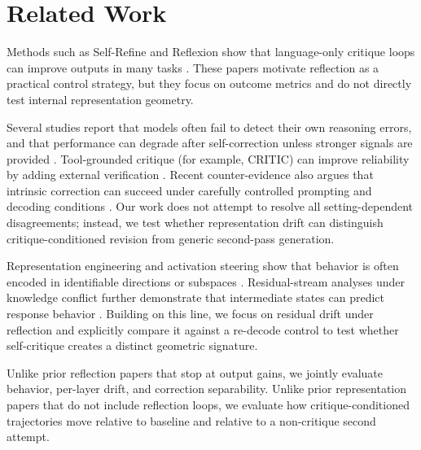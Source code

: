 \section{Related Work}
\label{sec:related}
 Methods such as Self-Refine and Reflexion show that language-only critique loops can improve outputs in many tasks \citep{madaan2023selfrefine,shinn2023reflexion}. These papers motivate reflection as a practical control strategy, but they focus on outcome metrics and do not directly test internal representation geometry.

 Several studies report that models often fail to detect their own reasoning errors, and that performance can degrade after self-correction unless stronger signals are provided \citep{huang2023llmscannot,chen2024errorlocation}. Tool-grounded critique (for example, CRITIC) can improve reliability by adding external verification \citep{gou2024critic}. Recent counter-evidence also argues that intrinsic correction can succeed under carefully controlled prompting and decoding conditions \citep{liu2024intrinsic}. Our work does not attempt to resolve all setting-dependent disagreements; instead, we test whether representation drift can distinguish critique-conditioned revision from generic second-pass generation.

 Representation engineering and activation steering show that behavior is often encoded in identifiable directions or subspaces \citep{zou2023representation,turner2023steering,arditi2024refusal}. Residual-stream analyses under knowledge conflict further demonstrate that intermediate states can predict response behavior \citep{zhao2024residual}. Building on this line, we focus on residual drift under reflection and explicitly compare it against a re-decode control to test whether self-critique creates a distinct geometric signature.

 Unlike prior reflection papers that stop at output gains, we jointly evaluate behavior, per-layer drift, and correction separability. Unlike prior representation papers that do not include reflection loops, we evaluate how critique-conditioned trajectories move relative to baseline and relative to a non-critique second attempt.
